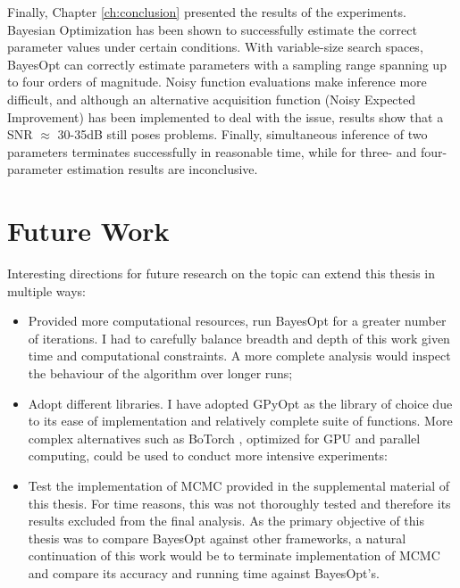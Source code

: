 \documentclass[bsc,frontabs,singlespacing,parskip,deptreport]{infthesis}
\begin{document}
Finally, Chapter \ref{ch:conclusion} presented the results of the experiments. Bayesian Optimization has been shown to successfully estimate the correct parameter values under certain conditions. With variable-size search spaces, BayesOpt can correctly estimate parameters with a sampling range spanning up to four orders of magnitude. Noisy function evaluations make inference more difficult, and although an alternative acquisition function (Noisy Expected Improvement) has been implemented to deal with the issue, results show that a SNR $\approx$ 30-35dB still poses problems. Finally, simultaneous inference of two parameters terminates successfully in reasonable time, while for three- and four-parameter estimation results are inconclusive.

\section{Future Work}
Interesting directions for future research on the topic can extend this thesis in multiple ways:

\begin{itemize}
    \item Provided more computational resources, run BayesOpt for a greater number of iterations. I had to carefully balance breadth and depth of this work given time and computational constraints. A more complete analysis would inspect the behaviour of the algorithm over longer runs;
    
    \item Adopt different libraries. I have adopted GPyOpt as the library of choice due to its ease of implementation and relatively complete suite of functions. More complex alternatives such as BoTorch \cite{BoTorch}, optimized for GPU and parallel computing, could be used to conduct more intensive experiments:
    
    \item Test the implementation of MCMC provided in the supplemental material of this thesis. For time reasons, this was not thoroughly tested and therefore its results excluded from the final analysis. As the primary objective of this thesis was to compare BayesOpt against other frameworks, a natural continuation of this work would be to terminate implementation of MCMC and compare its accuracy and running time against BayesOpt's.  
\end{itemize}



\end{document}
